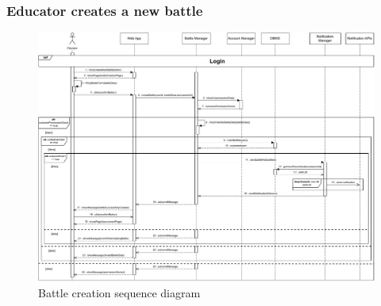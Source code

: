 \documentclass{article}
\begin{document}
{    \subsubsection{Educator creates a new battle}
        \begin{figure}[H]
            \centering
            \hspace*{-3.7cm}\includegraphics[scale=0.65]{Sequence/Sequence6DD.pdf}
            \caption{Battle creation sequence diagram}
            \label{fig:Sequence6DD}
        \end{figure}

}
\end{document}
